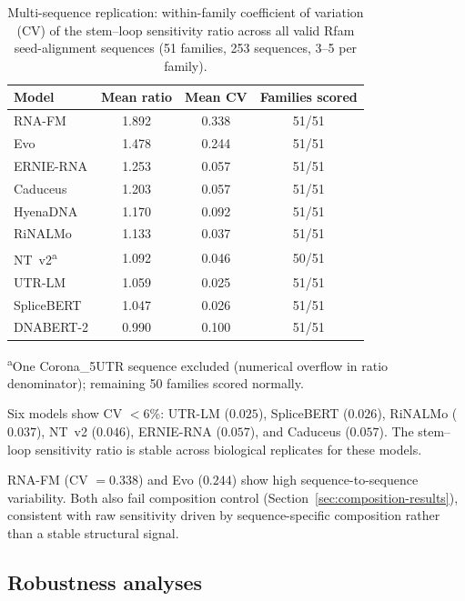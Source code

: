 \documentclass[11pt]{article}
\begin{document}
\begin{table}[htbp]
\centering
\caption{Multi-sequence replication: within-family coefficient of variation
(CV) of the stem--loop sensitivity ratio across all valid Rfam seed-alignment
sequences (51 families, 253 sequences, 3--5 per family).}
\label{tab:multiseq}
\begin{tabular}{@{}lccc@{}}
\toprule
\textbf{Model} & \textbf{Mean ratio} & \textbf{Mean CV} & \textbf{Families scored} \\
\midrule
RNA-FM     & 1.892 & 0.338 & 51/51 \\
Evo        & 1.478 & 0.244 & 51/51 \\
ERNIE-RNA  & 1.253 & 0.057 & 51/51 \\
Caduceus   & 1.203 & 0.057 & 51/51 \\
HyenaDNA   & 1.170 & 0.092 & 51/51 \\
RiNALMo    & 1.133 & 0.037 & 51/51 \\
NT~v2\textsuperscript{a} & 1.092 & 0.046 & 50/51 \\
UTR-LM     & 1.059 & 0.025 & 51/51 \\
SpliceBERT & 1.047 & 0.026 & 51/51 \\
DNABERT-2  & 0.990 & 0.100 & 51/51 \\
\bottomrule
\end{tabular}
\medskip

\small \textsuperscript{a}One Corona\_5UTR sequence excluded (numerical
overflow in ratio denominator); remaining 50 families scored normally.
\end{table}

Six models show CV $< 6$\%: UTR-LM ($0.025$), SpliceBERT ($0.026$),
RiNALMo ($0.037$), NT~v2 ($0.046$), ERNIE-RNA ($0.057$), and Caduceus
($0.057$). The stem--loop sensitivity ratio is stable across biological
replicates for these models.

RNA-FM (CV $= 0.338$) and Evo ($0.244$) show high sequence-to-sequence
variability. Both also fail composition control
(Section~\ref{sec:composition-results}), consistent with raw sensitivity
driven by sequence-specific composition rather than a stable structural
signal.


\subsection{Robustness analyses}
\label{sec:robustness}
\end{document}

